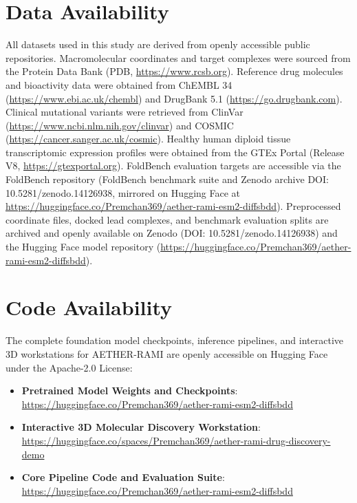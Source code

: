 \documentclass[11pt,a4paper]{article}
\begin{document}
\section*{Data Availability}
All datasets used in this study are derived from openly accessible public repositories. Macromolecular coordinates and target complexes were sourced from the Protein Data Bank (PDB, \url{https://www.rcsb.org}). Reference drug molecules and bioactivity data were obtained from ChEMBL 34 (\url{https://www.ebi.ac.uk/chembl}) and DrugBank 5.1 (\url{https://go.drugbank.com}). Clinical mutational variants were retrieved from ClinVar (\url{https://www.ncbi.nlm.nih.gov/clinvar}) and COSMIC (\url{https://cancer.sanger.ac.uk/cosmic}). Healthy human diploid tissue transcriptomic expression profiles were obtained from the GTEx Portal (Release V8, \url{https://gtexportal.org}). FoldBench evaluation targets are accessible via the FoldBench repository (FoldBench benchmark suite and Zenodo archive DOI: 10.5281/zenodo.14126938, mirrored on Hugging Face at \url{https://huggingface.co/Premchan369/aether-rami-esm2-diffsbdd}). Preprocessed coordinate files, docked lead complexes, and benchmark evaluation splits are archived and openly available on Zenodo (DOI: 10.5281/zenodo.14126938) and the Hugging Face model repository (\url{https://huggingface.co/Premchan369/aether-rami-esm2-diffsbdd}).

\section*{Code Availability}
The complete foundation model checkpoints, inference pipelines, and interactive 3D workstations for AETHER-RAMI are openly accessible on Hugging Face under the Apache-2.0 License:
\begin{itemize}\setlength{\itemsep}{0.5em}
    \item \textbf{Pretrained Model Weights and Checkpoints}:\\
    \url{https://huggingface.co/Premchan369/aether-rami-esm2-diffsbdd}
    \item \textbf{Interactive 3D Molecular Discovery Workstation}:\\
    \url{https://huggingface.co/spaces/Premchan369/aether-rami-drug-discovery-demo}
    \item \textbf{Core Pipeline Code and Evaluation Suite}:\\
    \url{https://huggingface.co/Premchan369/aether-rami-esm2-diffsbdd}
\end{itemize}
\end{document}
